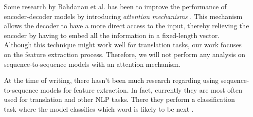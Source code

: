 Some research by Bahdanau et al. has been to improve the performance of encoder-decoder models by introducing \textit{attention mechanisms} \cite{attention_mechanisms}.
This mechanism allows the decoder to have a more direct access to the input, thereby relieving the encoder by having to embed all the information in a fixed-length vector.
Although this technique might work well for translation tasks, our work focuses on the feature extraction process.
Therefore, we will not perform any analysis on sequence-to-sequence models with an attention mechanism.

At the time of writing, there hasn't been much research regarding using sequence-to-sequence models for feature extraction.
In fact, currently they are most often used for translation and other NLP tasks.
There they perform a classification task where the model classifies which word is likely to be next \cite{tensorflowseq2seq,cho2014learning,rnnencoder,sutskever_vinyals_le}.

